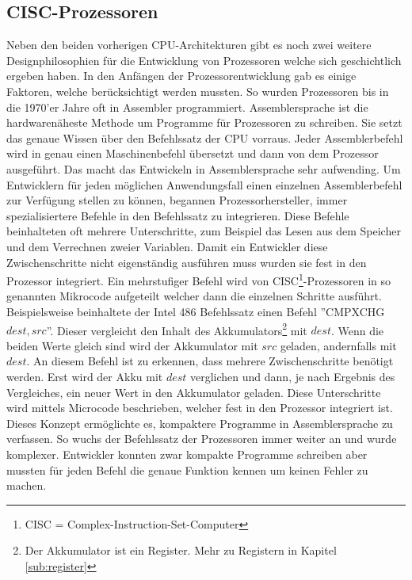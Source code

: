 \documentclass[12pt]{article}
\begin{document}
\subsection{CISC-Prozessoren}
Neben den beiden vorherigen CPU-Architekturen gibt es noch zwei weitere Designphilosophien für die Entwicklung von Prozessoren welche sich geschichtlich ergeben haben. In den Anfängen der Prozessorentwicklung gab es einige Faktoren, welche berücksichtigt werden mussten. So wurden Prozessoren bis in die 1970'er Jahre oft in Assembler programmiert. Assemblersprache ist die hardwarenäheste Methode um Programme für Prozessoren zu schreiben. Sie setzt das genaue Wissen über den Befehlssatz der CPU vorraus. Jeder Assemblerbefehl wird in genau einen Maschinenbefehl übersetzt und dann von dem Prozessor ausgeführt. Das macht das Entwickeln in Assemblersprache sehr aufwending. Um Entwicklern für jeden möglichen Anwendungsfall einen einzelnen Assemblerbefehl zur Verfügung stellen zu können, begannen Prozessorhersteller, immer spezialisiertere Befehle in den Befehlssatz zu integrieren. Diese Befehle beinhalteten oft mehrere Unterschritte, zum Beispiel das Lesen aus dem Speicher und dem Verrechnen zweier Variablen. Damit ein Entwickler diese Zwischenschritte nicht eigenständig ausführen muss wurden sie fest in den Prozessor integriert. Ein mehrstufiger Befehl wird von CISC\footnote{CISC = Complex-Instruction-Set-Computer}-Prozessoren in so genannten Mikrocode aufgeteilt welcher dann die einzelnen Schritte ausführt. Beispielsweise beinhaltete der Intel 486 Befehlssatz einen Befehl ''CMPXCHG  $dest,src$''\cite[S.172f]{intel4000}. Dieser vergleicht den Inhalt des Akkumulators\footnote{Der Akkumulator ist ein Register. Mehr zu Registern in Kapitel \ref{sub:register}} mit $dest$. Wenn die beiden Werte gleich sind wird der Akkumulator mit $src$ geladen, andernfalls mit $dest$. An diesem Befehl ist zu erkennen, dass mehrere Zwischenschritte benötigt werden. Erst wird der Akku mit $dest$ verglichen und dann, je nach Ergebnis des Vergleiches, ein neuer Wert in den Akkumulator geladen. Diese Unterschritte wird mittels Microcode beschrieben, welcher fest in den Prozessor integriert ist. Dieses Konzept ermöglichte es, kompaktere Programme in Assemblersprache zu verfassen. So wuchs der Befehlssatz der Prozessoren immer weiter an und wurde komplexer. Entwickler konnten zwar kompakte Programme schreiben aber mussten für jeden Befehl die genaue Funktion kennen um keinen Fehler zu machen. 

\end{document}
